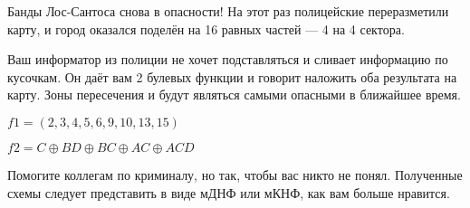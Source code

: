 \question
Банды Лос-Сантоса снова в опасности! На этот раз полицейские переразметили карту, и город оказался поделён на 16 равных частей — 4 на 4 сектора.

Ваш информатор из полиции не хочет подставляться и сливает информацию по кусочкам. Он даёт вам 2 булевых функции и говорит наложить оба результата на карту. Зоны пересечения и будут являться самыми опасными в ближайшее время.

\begin{center}
$f1=(2,3,4,5,6,9,10,13,15)$

$f2=C \oplus BD \oplus BC \oplus AC \oplus ACD$
\end{center}

Помогите коллегам по криминалу, но так, чтобы вас никто не понял. Полученные схемы следует представить в виде мДНФ или мКНФ, как вам больше нравится.